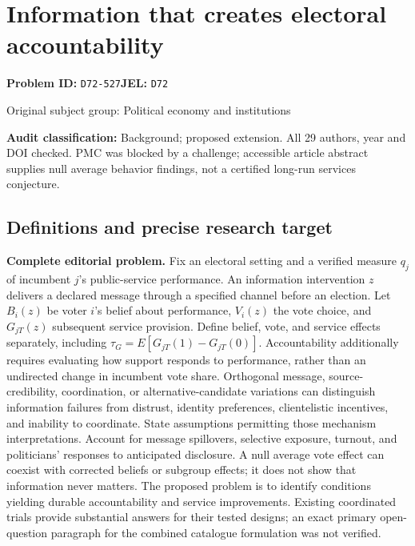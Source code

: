 \documentclass[11pt,a4paper]{article}
\begin{document}
\section*{Information that creates electoral accountability}
\textbf{Problem ID:} \texttt{D72-527}\quad \textbf{JEL:} \texttt{D72}\par
\label{problem:OP-0387}
{\sffamily\small\color{muted}Original subject group: Political economy and institutions\par}
\label{definitions:problem:30007669}
\textbf{Audit classification:} Background; proposed extension. All 29 authors, year and DOI checked. PMC was blocked by a challenge; accessible article abstract supplies null average behavior findings, not a certified long-run services conjecture.
\subsection*{Definitions and precise research target}
\textbf{Complete editorial problem.} Fix an electoral setting and a verified measure \(q_j\) of incumbent \(j\)'s public-service performance. An information intervention \(z\) delivers a declared message through a specified channel before an election. Let \(B_i(z)\) be voter \(i\)'s belief about performance, \(V_i(z)\) the vote choice, and \(G_{jT}(z)\) subsequent service provision. Define belief, vote, and service effects separately, including \(\tau_G=E[G_{jT}(1)-G_{jT}(0)]\). Accountability additionally requires evaluating how support responds to performance, rather than an undirected change in incumbent vote share. Orthogonal message, source-credibility, coordination, or alternative-candidate variations can distinguish information failures from distrust, identity preferences, clientelistic incentives, and inability to coordinate. State assumptions permitting those mechanism interpretations. Account for message spillovers, selective exposure, turnout, and politicians' responses to anticipated disclosure. A null average vote effect can coexist with corrected beliefs or subgroup effects; it does not show that information never matters. The proposed problem is to identify conditions yielding durable accountability and service improvements. Existing coordinated trials provide substantial answers for their tested designs; an exact primary open-question paragraph for the combined catalogue formulation was not verified.
\end{document}

